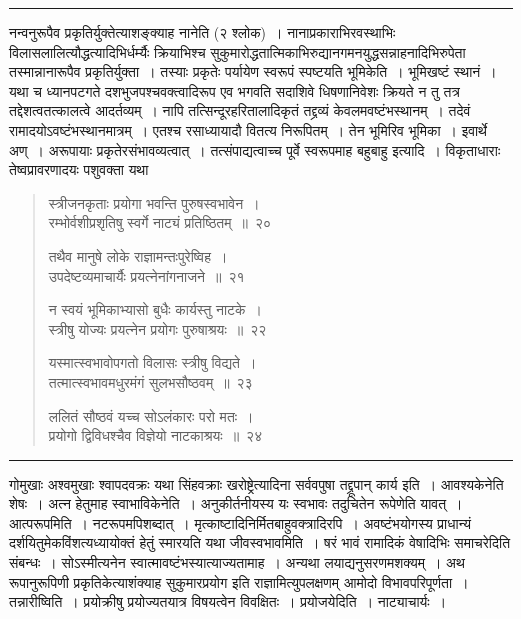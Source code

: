 \documentclass[11pt, openany]{book}
\begin{document}
\hrule

\vspace{2mm}
नन्वनुरूपैव प्रकृतिर्युक्तेत्याशङ्क्याह नानेति (२ श्लोक)~। नानाप्रकाराभिरवस्थाभिः विलासलालित्यौद्धत्यादिभिर्धर्म्यैः क्रियाभिश्च सुकुमारोद्धतात्मिकाभिरुद्यानगमनयुद्धसन्नाहनादिभिरुपेता तस्मान्नानारूपैव प्रकृतिर्युक्ता~। तस्याः प्रकृतेः पर्यायेण स्वरूपं स्पष्टयति भूमिकेति~। भूमिखष्टं स्थानं~। यथा च ध्यानपटगते दशभुजपश्चवक्त्वादिरूप एव भगवति सदाशिवे धिषणानिवेशः क्रियते न तु तत्र तद्देशत्वतत्कालत्वे आदर्तव्यम्~। नापि तत्सिन्दूरहरितालादिकृतं तद्द्रव्यं केवलमवष्टंभस्थानम्~। तदेवं रामादयोऽवष्टंभस्थानमात्रम्~। एतश्च रसाध्यायादौ वितत्य निरूपितम्~। तेन भूमिरिव भूमिका~। इवार्थे अण्~। अरूपायाः प्रकृतेरसंभावव्यत्वात्~। तत्संपाद्यत्वाच्च पूर्वे स्वरूपमाह बहुबाहु इत्यादि~। विकृताधाराः तेष्वप्रावरणादयः पशुवक्ता यथा

\newpage

\begin{quote}
{\na स्त्रीजनकृताः प्रयोगा भवन्ति पुरुषस्वभावेन~।\\
रम्भोर्वशीप्रशृतिषु स्वर्गे नाट्यं प्रतिष्ठितम्~॥~२०

तथैव मानुषे लोके राज्ञामन्तःपुरेष्विह~।\\
उपदेष्टव्यमाचार्यैः प्रयत्नेनांगनाजने~॥~२१

न स्वयं भूमिकाभ्यासो बुधैः कार्यस्तु नाटके~।\\
स्त्रीषु योज्यः प्रयत्नेन प्रयोगः पुरुषाश्रयः~॥~२२

यस्मात्स्वभावोपगतो विलासः स्त्रीषु विद्यते~।\\
तत्मात्स्वभावमधुरमंगं सुलभसौष्ठवम्~॥~२३

ललितं सौष्ठवं यच्च सोऽलंकारः परो मतः~।\\
प्रयोगो द्विविधश्चैव विज्ञेयो नाटकाश्रयः~॥~२४}
\end{quote}

\hrule

\vspace{2mm}
\noindent
गोमुखाः अश्वमुखाः श्वापदवक्रः यथा सिंहवक्राः खरोष्ट्रेत्यादिना सर्ववपुषा तद्द्रूपान् कार्य इति~। आवश्यकेनेति शेषः~। अत्न हेतुमाह स्वाभाविकेनेति~। अनुकीर्तनीयस्य यः स्वभावः तदुचितेन रूपेणेति यावत्~। आत्परूपमिति~। नटरूपमपिशब्दात्~। मृत्काष्टादिनिर्मितबाहुवक्त्रादिरपि~। अवष्टंभयोगस्य प्राधान्यं दर्शयितुमेकविंशत्यध्यायोक्तं हेतुं स्मारयति यथा जीवस्वभावमिति~। षरं भावं रामादिकं वेषादिभिः समाचरेदिति संबन्धः~। सोऽस्मीत्यनेन स्वात्मावष्टंभस्यात्याज्यतामाह~। अन्यथा लयाद्यनुसरणमशक्यम्~। अथ रूपानुरूपिणी प्रकृतिकेत्याशंक्याह सुकुमारप्रयोग इति राज्ञामित्युपलक्षणम् आमोदो विभावपरिपूर्णता~। तन्नारीष्विति~। प्रयोक्रीषु प्रयोज्यतयात्र विषयत्वेन विवक्षितः~। प्रयोजयेदिति~। नाट्याचार्यः~।
\end{document}
